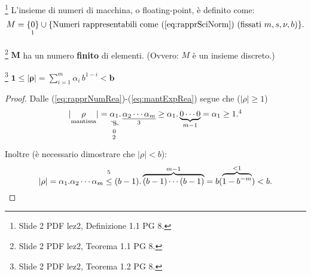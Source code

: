 \begin{definition}\footnote{Slide 2 PDF lez2, Definizione 1.1 PG 8.}
    L'insieme di numeri di macchina, o floating-point, è definito come:
    \begin{equation}
        M = \underset{\footnotemark}{\{0\}}\cup \{\text{Numeri rappresentabili come (\ref{eq:rapprSciNorm}) (fissati }m,s,\nu, b) \}.
    \end{equation}
\end{definition}

\begin{theorem}\footnote{Slide 2 PDF lez2, Teorema 1.1 PG 8.}
$\boldsymbol M$ ha un numero \textbf{finito} di elementi. (Ovvero: $M$ è un insieme discreto.)
\end{theorem}

\begin{theorem}\footnote{Slide 2 PDF lez2, Teorema 1.2 PG 8.}
$\boldsymbol{1\leq |\rho|}=\sum_{i=1}^m \alpha_i\, b^{1-i}\boldsymbol{<b}$
\end{theorem}
\begin{proof}
    Dalle (\ref{eq:rapprNumRea})-(\ref{eq:mantExpRea}) segue che ($|\rho|\geq 1$)
    \begin{equation*}
        |\underset{\text{mantissa}}{\rho}|= \underset{\footnotemark}{\neqto{\alpha_1}{0}}.\,\underset{\footnotemark}{\uline{\alpha_2\cdots\alpha_m}}\geq\alpha_1.\underbrace{0\cdots 0}_{m-1}=\alpha_1\geq 1.\footnotemark
    \end{equation*}
    Inoltre (è necessario dimostrare che $|\rho|<b$):
    \begin{equation*}
        |\rho|=\alpha_1.\alpha_2\cdots\alpha_m\overset{\footnotemark}{\leq}(b-1).\overbrace{(b-1)\cdots (b-1)}^{m-1}=b(\overbrace{1-b^{-m}}^{<1})<b.
    \end{equation*}
\end{proof}
\addtocounter{footnote}{-3}




